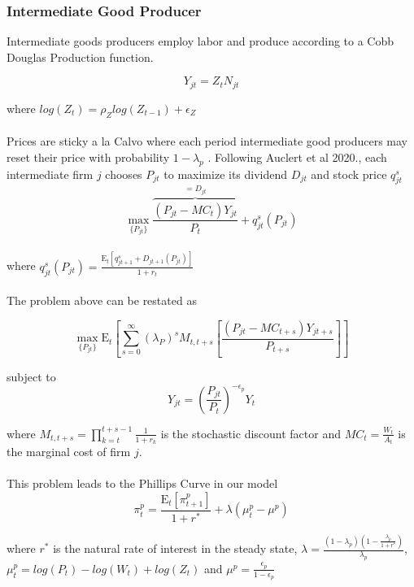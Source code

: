 \documentclass[titlepage]{\econtex}\providecommand{\texname}{BufferStockTheory}
\begin{document}
\hypertarget{Intermediate Good Producer}{}
\subsubsection{Intermediate Good Producer}

Intermediate goods producers  employ labor and produce according to a Cobb Douglas Production function.  

$$Y_{jt} =  Z_{t}  N_{jt}$$ 

where $log(Z_{t}) = \rho_{Z} log( Z_{t-1}) + \epsilon_{Z}$ \\ \\


Prices are sticky a la Calvo where each period intermediate good producers may reset their price with probability $ 1 -\lambda_{p}$ . Following Auclert et al 2020., each intermediate firm $j$ chooses $P_{jt}$ to maximize its dividend $D_{jt}$ and  stock price $q^{s}_{jt} $ \\ 
 
 $$\max_{\{P_{jt}\}} \overbrace{\frac{(P_{jt} - MC_{t})Y_{jt}}{P_{t}}}^{=D_{jt}} + q^{s}_{jt}\left(P_{jt}\right) $$ \\
 
where  $q^{s}_{jt}\left(P_{jt}\right) = \frac{\mathrm{E}_{t}\left[q^{s}_{jt+1} +D_{jt+1}\left(P_{jt}\right)\right]}{1+r_{t}}$ \\ \\

The problem above can be restated as 
 
 $$\max_{\{P_{jt}\}} \mathrm{E}_{t}\left[\sum_{s=0}^{\infty} (\lambda_{P}) ^{s} M_{t,t+s} \left[ \frac{(P_{jt} - MC_{t+s})Y_{jt+s}}{P_{t+s}}\right]\right]$$
 
subject to $$Y_{jt} = \left(\frac {P_{jt}}{P_{t}}\right)^{- \epsilon_{p}} Y_{t}$$
 
where $M_{t, t+s} = \prod_{k=t}^{t+s-1} \frac{1}{1+r_{k}}$ is the stochastic discount factor and $MC_{t} = \frac{W_{t}}{A_{t}}$ is the marginal cost of firm $j$.  \\ \\


This problem leads to the Phillips Curve in our model \\ 

$$ \pi_{t}^{p} = \frac{\mathrm{E}_{t}[\pi_{t+1}^{p}]}{1+r^{*}} + \lambda (\mu_{t}^{p} -\mu^{p})$$

where $r^{*}$ is the natural rate of interest in the steady state, $\lambda = \frac{(1-\lambda_{p})(1-\frac{\lambda_{p}}{1+r^{*}})}{\lambda_{p}}$,  $ \mu_{t}^{p} = log(P_{t}) - log(W_{t}) + log(Z_{t})$ and $\mu^{p} = \frac{\epsilon_{p}}{1-\epsilon_{p}}$ \\ \\
\end{document}
